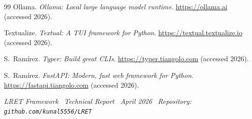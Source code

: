 \documentclass[11pt,a4paper]{article}
\begin{document}
\begin{thebibliography}{99}
  Ollama.
  \textit{Ollama: Local large language model runtime}.
  \url{https://ollama.ai} (accessed 2026).

  Textualize.
  \textit{Textual: A TUI framework for Python}.
  \url{https://textual.textualize.io} (accessed 2026).

  S.~Ram\'irez.
  \textit{Typer: Build great CLIs}. \url{https://typer.tiangolo.com} (accessed 2026).

  S.~Ram\'irez.
  \textit{FastAPI: Modern, fast web framework for Python}.
  \url{https://fastapi.tiangolo.com} (accessed 2026).

\end{thebibliography}

\vspace{2em}
\begin{center}
\small\textit{LRET Framework \textbullet\ Technical Report \textbullet\ April 2026
\textbullet\ Repository: \texttt{github.com/kunal5556/LRET}}
\end{center}
\end{document}
